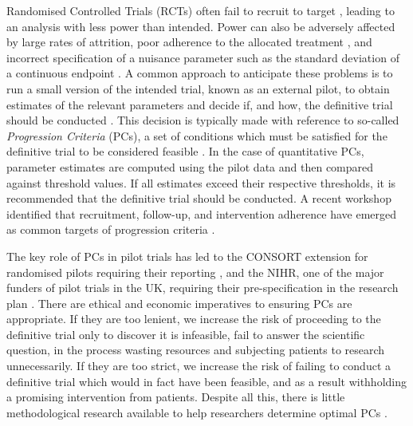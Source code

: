 \documentclass[AMA,STIX1COL]{WileyNJD-v2}
\begin{document}
Randomised Controlled Trials (RCTs) often fail to recruit to target \cite{Sully2013}, leading to an analysis with less power than intended. Power can also be adversely affected by large rates of attrition, poor adherence to the allocated treatment \cite{Fay2006}, and incorrect specification of a nuisance parameter such as the standard deviation of a continuous endpoint \cite{Teare2014}. A common approach to anticipate these problems is to run a small version of the intended trial, known as an external pilot, to obtain estimates of the relevant parameters and decide if, and how, the definitive trial should be conducted  \cite{Craig2008, Eldridge2016}. This decision is typically made with reference to so-called \emph{Progression Criteria} (PCs), a set of conditions which must be satisfied for the definitive trial to be considered feasible \cite{Avery2017}. In the case of quantitative PCs, parameter estimates are computed using the pilot data and then compared against threshold values. If all estimates exceed their respective thresholds, it is recommended that the definitive trial should be conducted. A recent workshop identified that recruitment, follow-up, and intervention adherence have emerged as common targets of progression criteria \cite{Avery2017}. 

The key role of PCs in pilot trials has led to the CONSORT extension for randomised pilots requiring their reporting \cite{Eldridge2016a}, and the NIHR, one of the major funders of pilot trials in the UK, requiring their pre-specification in the research plan \cite{NIHR2017}. There are ethical and economic imperatives to ensuring PCs are appropriate. If they are too lenient, we increase the risk of proceeding to the definitive trial only to discover it is infeasible, fail to answer the scientific question, in the process wasting resources and subjecting patients to research unnecessarily. If they are too strict, we increase the risk of failing to conduct a definitive trial which would in fact have been feasible, and as a result withholding a promising intervention from patients. Despite all this, there is little methodological research available to help researchers determine optimal PCs \cite{Avery2017}. 

\end{document}
